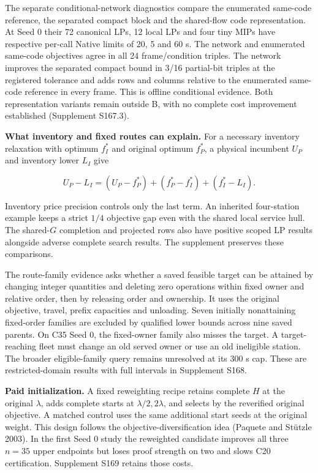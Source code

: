 \documentclass[
  american,
  11pt,
]{article}
\begin{document}
The separate conditional-network diagnostics compare the enumerated
same-code reference, the separated compact block and the shared-flow
code representation. At Seed 0 their 72 canonical LPs, 12 local LPs and
four tiny MIPs have respective per-call Native limits of 20, 5 and 60 s.
The network and enumerated same-code objectives agree in all 24
frame/condition triples. The network improves the separated compact
bound in 3/16 partial-bit triples at the registered tolerance and adds
rows and columns relative to the enumerated same-code reference in every
frame. This is offline conditional evidence. Both representation
variants remain outside B, with no complete cost improvement established
(Supplement S167.3).

\textbf{What inventory and fixed routes can explain.} For a necessary
inventory relaxation with optimum \(f_I^*\) and original optimum
\(f_P^*\), a physical incumbent \(U_P\) and inventory lower \(L_I\) give

\[
U_P-L_I=(U_P-f_P^*)+(f_P^*-f_I^*)+(f_I^*-L_I).
\]

Inventory price precision controls only the last term. An inherited
four-station example keeps a strict \(1/4\) objective gap even with the
shared local service hull. The shared-\(G\) completion and projected
rows also have positive scoped LP results alongside adverse complete
search results. The supplement preserves these comparisons.

The route-family evidence asks whether a saved feasible target can be
attained by changing integer quantities and deleting zero operations
within fixed owner and relative order, then by releasing order and
ownership. It uses the original objective, travel, prefix capacities and
unloading. Seven initially nonattaining fixed-order families are
excluded by qualified lower bounds across nine saved parents. On C35
Seed 0, the fixed-owner family also misses the target. A target-reaching
fleet must change an old served owner or use an old ineligible station.
The broader eligible-family query remains unresolved at its 300 s cap.
These are restricted-domain results with full intervals in Supplement
S168.

\textbf{Paid initialization.} A fixed reweighting recipe retains
complete \(H\) at the original \(\lambda\), adds complete starts at
\(\lambda/2,2\lambda\), and selects by the reverified original
objective. A matched control uses the same additional start seeds at the
original weight. This design follows the objective-diversification idea
(Paquete and Stützle 2003). In the first Seed 0 study the reweighted
candidate improves all three \(n=35\) upper endpoints but loses proof
strength on two and slows C20 certification. Supplement S169 retains
those costs.
\end{document}
